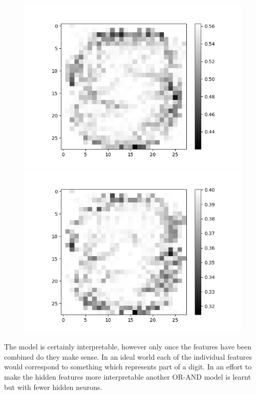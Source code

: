 \begin{figure}[H]
\begin{minipage}[b]{0.45\textwidth}
		\includegraphics[width=\textwidth]{LNN-OR-AND/Digit-5.png}
		\caption{}
		\label{fig:lnn-or-and-digit-5}
	\end{minipage}
	\begin{minipage}[b]{0.45\textwidth}
		\includegraphics[width=\textwidth]{LNN-OR-AND/Digit-8.png}
		\caption{}
		\label{fig:lnn-or-and-digit-8}
	\end{minipage}
	\hfill
\end{figure}

The model is certainly interpretable, however only once the features have been combined do they make sense. In an ideal world each of the individual features would correspond to something which represents part of a digit. In an effort to make the hidden features more interpretable another OR-AND model is learnt but with fewer hidden neurons.


